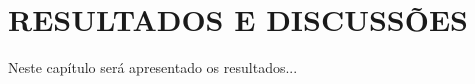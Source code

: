 \chapter{RESULTADOS E DISCUSSÕES}
\label{cap:cap5}
\vspace{-2cm}

Neste capítulo será apresentado os resultados...


\newpage  %

